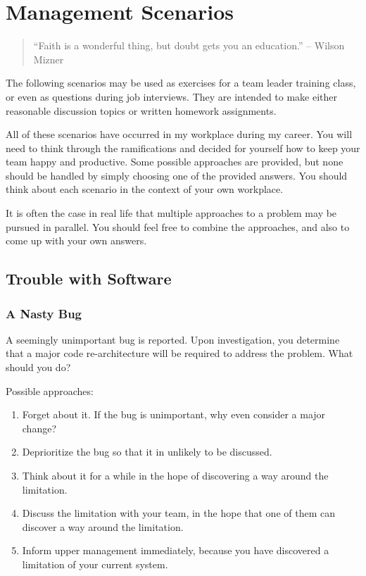 %
%


\chapter{Management Scenarios}

\begin{quote}
``Faith is a wonderful thing, but doubt gets you an education.'' -- Wilson Mizner
\end{quote}

The following scenarios may be used as exercises for a team leader training class, or even as questions during job interviews. They are intended to make either reasonable discussion topics or written homework assignments.

All of these scenarios have occurred in my workplace during my career. You will need to think through the ramifications and decided for yourself how to keep your team happy and productive. Some possible approaches are provided, but none should be handled by simply choosing one of the provided answers. You should think about each scenario in the context of your own workplace.

It is often the case in real life that multiple approaches to a problem may be pursued in parallel. You should feel free to combine the approaches, and also to come up with your own answers.


\section{Trouble with Software}

\subsection{A Nasty Bug}

A seemingly unimportant bug is reported. Upon investigation, you determine that a major code re-architecture will be required to address the problem. What should you do?

Possible approaches:

\begin{enumerate}
\item Forget about it. If the bug is unimportant, why even consider a major change?
\item Deprioritize the bug so that it in unlikely to be discussed.
\item Think about it for a while in the hope of discovering a way around the limitation.
\item Discuss the limitation with your team, in the hope that one of them can discover a way around the limitation.
\item Inform upper management immediately, because you have discovered a limitation of your current system.
\end{enumerate}


